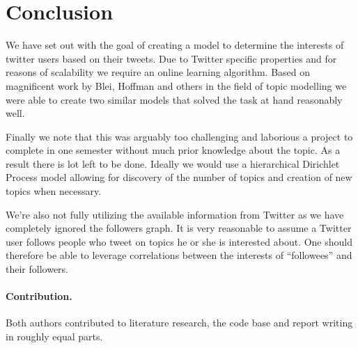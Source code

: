 \section{Conclusion}
We have set out with the goal of creating a model to determine the interests of twitter users based on their tweets. Due to Twitter specific properties and for reasons of scalability we require an online learning algorithm. Based on magnificent work by Blei, Hoffman and others in the field of topic modelling we were able to create two similar models that solved the task at hand reasonably well.

Finally we note that this was arguably too challenging and laborious a project to complete in one semester without much prior knowledge about the topic. As a result there is lot left to be done. Ideally we would use a hierarchical Dirichlet Process model allowing for discovery of the number of topics and creation of new topics when necessary.

We're also not fully utilizing the available information from Twitter as we have completely ignored the followers graph. It is very reasonable to assume a Twitter user follows people who tweet on topics he or she is interested about. One should therefore be able to leverage correlations between the interests of ``followees'' and their followers.

\paragraph{Contribution.}
Both authors contributed to literature research, the code base and report writing in roughly equal parts.